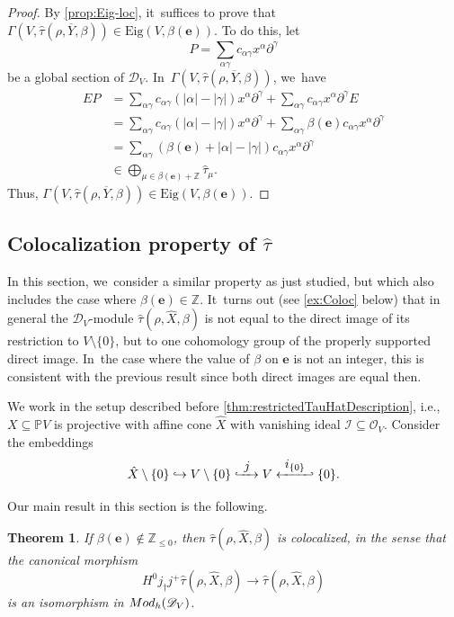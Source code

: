 \documentclass[11pt]{article}
\newcommand{\ie}{i.e.,\xspace}
\let\mathds\mathbb
\newcommand\hto{\mathrel{\lhook\joinrel\to}}
\newcommand{\To}[1]{\mathchoice{\xrightarrow{\textstyle\kern4pt#1\kern3pt}}{\xrightarrow{\,#1\,}}{}{}}
\newcommand\Hto[1]{\mathrel{\lhook\joinrel\To{#1}}}
\newcommand{\From}[1]{\mathchoice{\xleftarrow{\textstyle~#1~}}{\xleftarrow{\,#1\,}}{}{}}
\newcommand\Hfrom[1]{\mathrel{\From{#1}\joinrel\rhook}}
\newcommand{\bme}{{\boldsymbol{e}}}
\newcommand{\Eig}{\mathrm{Eig}}
\newtheorem{thm}{Theorem}[section]
\newcommand{\dZ}{{\mathds Z}}\let\mbz\dZ\let\Z\dZ
\newcommand{\dP}{{\mathds P}}\let\P\dP
\newcommand{\cD}{\mathscr{D}}
\newcommand{\cI}{\mathcal{I}}
\newcommand{\cO}{\mathcal{O}}\let\O\cO
\begin{document}
\begin{proof}
By \cref{prop:Eig-loc}, it~suffices to prove that $\Gamma(V, \hat\tau(\rho, \overline Y, \beta))\in \Eig(V,\beta(\bme))$. To do this, let
\[
P= \sum_{\alpha\gamma} c_{\alpha\gamma} x^\alpha\partial^\gamma
\]
be a global section of $\mathscr{D}_V$. In~$\Gamma(V, \hat\tau(\rho, \overline Y, \beta))$, we~have
\begin{align*}
EP &= \sum_{\alpha\gamma} c_{\alpha\gamma} (|\alpha| - |\gamma|)x^\alpha\partial^\gamma + \sum_{\alpha\gamma} c_{\alpha\gamma} x^\alpha\partial^\gamma E\\
&= \sum_{\alpha\gamma} c_{\alpha\gamma} (|\alpha| - |\gamma|)x^\alpha\partial^\gamma + \sum_{\alpha\gamma} \beta(\bme)c_{\alpha\gamma} x^\alpha\partial^\gamma\\
&= \sum_{\alpha\gamma} (\beta(\bme) + |\alpha| - |\gamma|)c_{\alpha\gamma}x^\alpha\partial^\gamma\\
&\in \bigoplus_{\mu \in \beta(\bme) + \Z} \hat\tau_\mu.
\end{align*}
Thus, $\Gamma(V, \hat\tau(\rho, \overline Y, \beta))\in \Eig(V,\beta(\bme))$.
\end{proof}

\subsection{Colocalization property of \texorpdfstring{$\widehat{\tau}$}{\textbackslash hat\textbackslash tau}}
\label{subsec:CoLocProp}

In this section, we~consider a similar property as just studied, but which also includes the case where $\beta(\bme)\in \dZ$. It~turns out (see \cref{ex:Coloc} below) that in general the $\cD_V$\nobreakdash-mod\-ule $\hat{\tau}(\rho, \hat{X}, \beta)$ is not equal to the direct image of its restriction to $V\setminus \{0\}$, but to one cohomology group of the properly supported direct image. In~the case where the value of $\beta$ on $\bme$ is not an integer, this is consistent with the previous result since both direct images are equal then.

We work in the setup described before \cref{thm:restrictedTauHatDescription}, \ie $X\subseteq \dP V$ is projective with affine cone $\hat{X}$ with vanishing ideal $\cI\subseteq \cO_V$. Consider the embeddings
\[
\hat{X} \setminus \{0\} \hto V\setminus\{0\} \Hto{j} V\Hfrom{i_{\{0\}}} \{0\}.
\]

Our main result in this section is the following.

\begin{thm}\label{theo:coloc}
If $\beta(\bme)\notin \dZ_{\leq 0}$, then
$\hat{\tau}(\rho, \hat{X}, \beta)$ is colocalized, in the sense that the canonical morphism
\[
H^0j_\dag j^+ \hat{\tau}(\rho, \hat{X}, \beta) \to \hat{\tau}(\rho, \hat{X}, \beta)
\]
is an isomorphism in $\textup{Mod}_h(\cD_V)$.
\end{thm}
\end{document}

